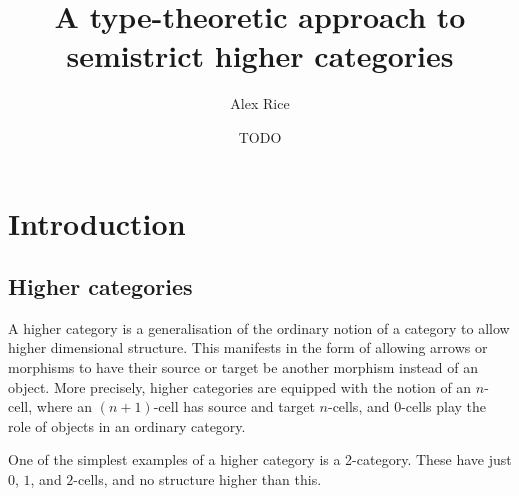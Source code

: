 \documentclass{cam-thesis}
\title{A type-theoretic approach to semistrict higher categories}
\author{Alex Rice}
\date{TODO}
\begin{document}
\frontmatter{}



\chapter{Introduction}

\section{Higher categories}
\label{sec:higher-categories}

A higher category is a generalisation of the ordinary notion of a category to allow higher dimensional structure. This manifests in the form of allowing arrows or morphisms to have their source or target be another morphism instead of an object. More precisely, higher categories are equipped with the notion of an \(n\)-cell, where an \((n+1)\)-cell has source and target \(n\)-cells, and \(0\)-cells play the role of objects in an ordinary category.



One of the simplest examples of a higher category is a 2-category. These have just \(0\), \(1\), and \(2\)-cells, and no structure higher than this.
\end{document}
